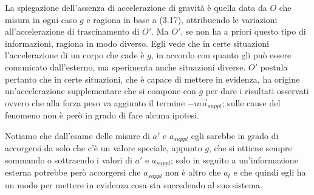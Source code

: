 \documentclass[class=book, crop=false, oneside, 12pt]{standalone}
\begin{document}
La spiegazione dell'assenza di accelerazione di gravità è quella data da \(O\) che misura in ogni caso \(g\) e ragiona in base a (3.17), attribuendo le variazioni all'accelerazione di trascinamento di \(O'\).
Ma \(O'\), se non ha a priori questo tipo di informazioni, ragiona in modo diverso. 
Egli vede che in certe situazioni l'accelerazione di un corpo che cade è \(g\), in accordo con quanto gli può essere comunicato dall'esterno, ma sperimenta anche situazioni diverse. 
\(O'\) postula pertanto che in certe situazioni, che è capace di mettere in evidenza, ha origine un'accelerazione supplementare che si compone con \(g\) per dare i risultati osservati ovvero che alla forza peso va aggiunto il termine \(-m \overrightarrow{a}_{suppl}\); sulle cause del fenomeno non è però in grado di fare alcuna ipotesi.

Notiamo che dall'esame delle misure di \(a'\) e \(a_{suppl}\) egli sarebbe in grado di accorgersi da solo che c'è un valore speciale, appunto \(g\), che si ottiene sempre sommando o sottraendo i valori di \(a'\) e \(a_{suppl}\); solo in seguito a un'informazione esterna potrebbe però accorgersi che \(a_{suppl}\) non è altro che \(a_t\) e che quindi egli ha un modo per mettere in evidenza cosa sta succedendo al suo sistema.
\end{document}
